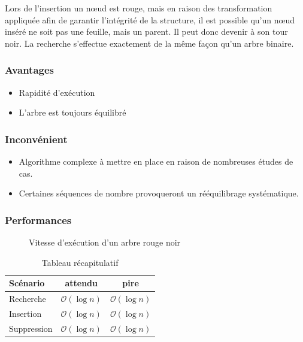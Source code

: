 \documentclass[hidelinks,a4paper, 12pt]{article}
\begin{document}
	Lors de l'insertion un nœud est rouge, mais en raison des transformation appliquée afin de garantir l'intégrité de la structure, il est possible qu'un nœud inséré ne soit pas une feuille, mais un parent. Il peut donc devenir à son tour noir. La recherche s'effectue exactement de la même façon qu'un arbre binaire. 
	\subsubsection*{Avantages}
	\begin{itemize}
		\item Rapidité d'exécution
		\item L'arbre est toujours équilibré
	\end{itemize}
	\subsubsection*{Inconvénient}
	\begin{itemize}
		\item Algorithme complexe à mettre en place en raison de nombreuses études de cas.
		\item Certaines séquences de nombre provoqueront un rééquilibrage systématique.
	\end{itemize}
	\subsubsection*{Performances}
	\begin{figure}[h]
		\centering
		\caption{Vitesse d'exécution d'un arbre rouge noir}
	\end{figure}
	\begin{table}[h]
		\begin{tabular}{|l|c|c|}
			\hline
			Scénario & attendu & pire \\
			\hline
			Recherche & $\mathcal{O}(\log n)$ & $\mathcal{O}(\log n)$ \\ 
			\hline
			Insertion & $\mathcal{O}(\log n)$ & $\mathcal{O}(\log n)$ \\
			\hline
			Suppression & $\mathcal{O}(\log n)$ & $\mathcal{O}(\log n)$\\
			\hline
		\end{tabular}
		\caption{Tableau récapitulatif}
	\end{table}
	
\end{document}
